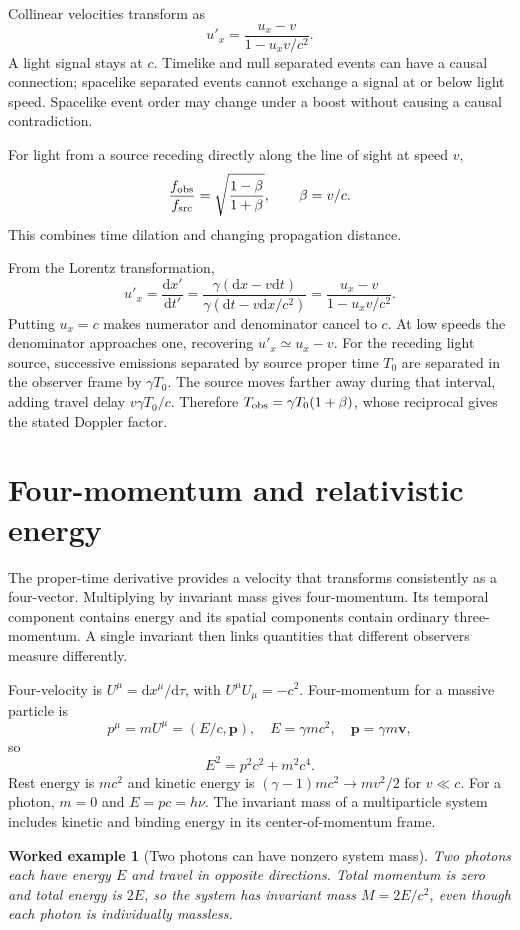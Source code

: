 \documentclass[11pt,oneside]{book}
\newcommand{\dd}{\mathrm{d}}
\newcommand{\vect}[1]{\boldsymbol{#1}}
\theoremstyle{reviewstyle}
\newtheorem{example}{Worked example}[chapter]
\begin{document}
Collinear velocities transform as
\begin{equation}u'_x=\frac{u_x-v}{1-u_xv/c^2}.\end{equation}
A light signal stays at $c$. Timelike and null separated events can have a causal connection; spacelike separated events cannot exchange a signal at or below light speed. Spacelike event order may change under a boost without causing a causal contradiction.

For light from a source receding directly along the line of sight at speed $v$,
\begin{equation}\frac{f_{\rm obs}}{f_{\rm src}}=\sqrt{\frac{1-\beta}{1+\beta}},\qquad \beta=v/c.\end{equation}
This combines time dilation and changing propagation distance.

From the Lorentz transformation,
\begin{equation}
u'_x=\frac{\dd x'}{\dd t'}=
\frac{\gamma(\dd x-v\dd t)}{\gamma(\dd t-v\dd x/c^2)}
=\frac{u_x-v}{1-u_xv/c^2}.
\end{equation}
Putting $u_x=c$ makes numerator and denominator cancel to $c$. At low speeds the denominator approaches one, recovering $u'_x\simeq u_x-v$. For the receding light source, successive emissions separated by source proper time $T_0$ are separated in the observer frame by $\gamma T_0$. The source moves farther away during that interval, adding travel delay $v\gamma T_0/c$. Therefore $T_{\rm obs}=\gamma T_0(1+\beta)$, whose reciprocal gives the stated Doppler factor.

\section{Four-momentum and relativistic energy}
The proper-time derivative provides a velocity that transforms consistently as a four-vector. Multiplying by invariant mass gives four-momentum. Its temporal component contains energy and its spatial components contain ordinary three-momentum. A single invariant then links quantities that different observers measure differently.

Four-velocity is $U^\mu=\dd x^\mu/\dd\tau$, with $U^\mu U_\mu=-c^2$. Four-momentum for a massive particle is
\begin{equation}
p^\mu=mU^\mu=(E/c,\vect p),\quad
E=\gamma mc^2,\quad \vect p=\gamma m\vect v,
\end{equation}
so
\begin{equation}\boxed{E^2=p^2c^2+m^2c^4.}\end{equation}
Rest energy is $mc^2$ and kinetic energy is $(\gamma-1)mc^2\to mv^2/2$ for $v\ll c$. For a photon, $m=0$ and $E=pc=h\nu$. The invariant mass of a multiparticle system includes kinetic and binding energy in its center-of-momentum frame.
\begin{example}[Two photons can have nonzero system mass]
Two photons each have energy $E$ and travel in opposite directions. Total momentum is zero and total energy is $2E$, so the system has invariant mass $M=2E/c^2$, even though each photon is individually massless.
\end{example}
\end{document}
